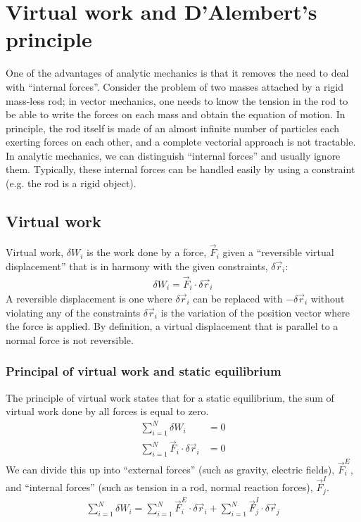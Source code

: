 \chapter{Virtual work and D'Alembert's principle}
One of the advantages of analytic mechanics is that it removes the need to deal with ``internal forces''. Consider the problem of two masses attached by a rigid mass-less rod; in vector mechanics, one needs to know the tension in the rod to be able to write the forces on each mass and obtain the equation of motion. In principle, the rod itself is made of an almost infinite number of particles each exerting forces on each other, and a complete vectorial approach is not tractable. In analytic mechanics, we can distinguish ``internal forces'' and usually ignore them. Typically, these internal forces can be handled easily by using a constraint (e.g. the rod is a rigid object).

\section{Virtual work}
Virtual work, $\delta W_i$ is the work done by a force, $\vec{F}_i$ given a ``reversible virtual displacement'' that is in harmony with the given constraints, $\delta\vec{r}_i$:
\begin{align}
\delta W_i = \vec{F}_i\cdot\delta\vec{r}_i
\end{align}
A reversible displacement is one where $\delta\vec{r}_i$ can be replaced with $-\delta\vec{r}_i$ without violating any of the constraints $\delta\vec{r}_i$ is the variation of the position vector where the force is applied.  By definition, a virtual displacement that is parallel to a normal force is not reversible.

\subsection{Principal of virtual work and static equilibrium}
The principle of virtual work states that for a static equilibrium, the sum of virtual work done by all forces is equal to zero.
\begin{align}
\sum_{i=1}^N\delta W_i &= 0 \nonumber\\
\sum_{i=1}^N\vec{F}_i\cdot\delta\vec{r}_i &= 0
\end{align}
We can divide this up into ``external forces'' (such as gravity, electric fields), $\vec{F}^E_i$, and ``internal forces'' (such as tension in a rod, normal reaction forces), $\vec{F}^I_j$.
\begin{align}
\sum_{i=1}^N\delta W_i=\sum_{i=1}^N \vec{F}^E_i\cdot\delta\vec{r}_i + \sum_{i=1}^N\vec{F}^I_j\cdot\delta\vec{r}_j
\end{align}

